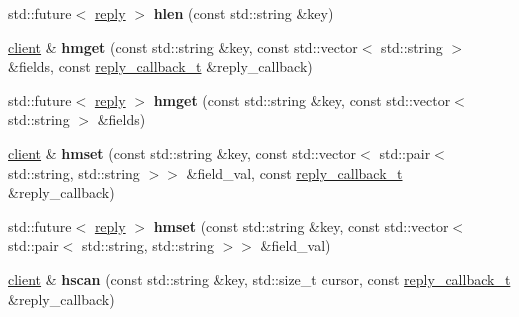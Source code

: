 \begin{DoxyCompactItemize}
\item 
\mbox{\label{classcpp__redis_1_1client_a34b5783e7392f29dd26c6e114d535221}} 
std\+::future$<$ \hyperlink{classcpp__redis_1_1reply}{reply} $>$ {\bfseries hlen} (const std\+::string \&key)
\item 
\mbox{\label{classcpp__redis_1_1client_aac28715b6b151dd96ddb760fcc490c3c}} 
\hyperlink{classcpp__redis_1_1client}{client} \& {\bfseries hmget} (const std\+::string \&key, const std\+::vector$<$ std\+::string $>$ \&fields, const \hyperlink{classcpp__redis_1_1client_a061a1140d36d2eaeda82b09a0bb3f9f2}{reply\+\_\+callback\+\_\+t} \&reply\+\_\+callback)
\item 
\mbox{\label{classcpp__redis_1_1client_a8e3af68988204e491ada35efaaf9b247}} 
std\+::future$<$ \hyperlink{classcpp__redis_1_1reply}{reply} $>$ {\bfseries hmget} (const std\+::string \&key, const std\+::vector$<$ std\+::string $>$ \&fields)
\item 
\mbox{\label{classcpp__redis_1_1client_a8c5f96c6e663d89aa18baba495872cfb}} 
\hyperlink{classcpp__redis_1_1client}{client} \& {\bfseries hmset} (const std\+::string \&key, const std\+::vector$<$ std\+::pair$<$ std\+::string, std\+::string $>$$>$ \&field\+\_\+val, const \hyperlink{classcpp__redis_1_1client_a061a1140d36d2eaeda82b09a0bb3f9f2}{reply\+\_\+callback\+\_\+t} \&reply\+\_\+callback)
\item 
\mbox{\label{classcpp__redis_1_1client_acbb8d8fa40a64a155e19e49aae12f117}} 
std\+::future$<$ \hyperlink{classcpp__redis_1_1reply}{reply} $>$ {\bfseries hmset} (const std\+::string \&key, const std\+::vector$<$ std\+::pair$<$ std\+::string, std\+::string $>$$>$ \&field\+\_\+val)
\item 
\mbox{\label{classcpp__redis_1_1client_a982be06bd7f06cad392453697980b49e}} 
\hyperlink{classcpp__redis_1_1client}{client} \& {\bfseries hscan} (const std\+::string \&key, std\+::size\+\_\+t cursor, const \hyperlink{classcpp__redis_1_1client_a061a1140d36d2eaeda82b09a0bb3f9f2}{reply\+\_\+callback\+\_\+t} \&reply\+\_\+callback)
\item 
\mbox{\label{classcpp__redis_1_1client_ab5d944206bf5be886be130ab5e341219}} 

\end{DoxyCompactItemize}
